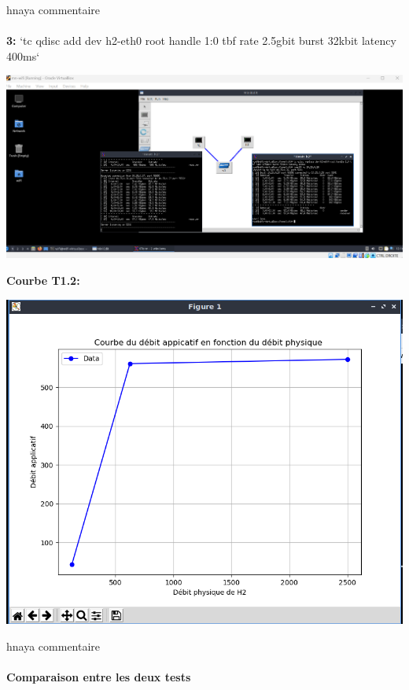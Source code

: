 hnaya commentaire\\
\\
\vspace{1cm}
\textbf{3:} `tc qdisc add dev h2-eth0 root handle 1:0 tbf rate 2.5gbit burst 32kbit latency 400ms`
\begin{center}
    \includegraphics[width=1\textwidth]{./images/15.png}
\end{center}

\newpage
\textbf{Courbe T1.2:} 
\begin{center}
    \includegraphics[width=1\textwidth]{./images/CourbeT1.2.png} \\
\end{center}
hnaya commentaire\\
\\
\textbf{Comparaison entre les deux tests} 





